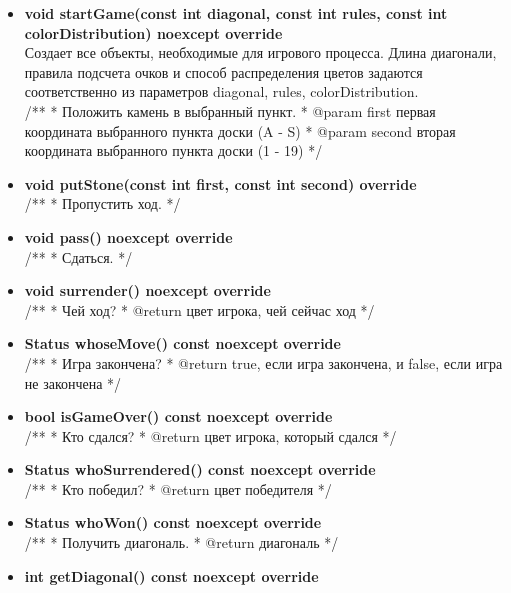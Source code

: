 \begin{itemize}

\item\textbf{void startGame(const int diagonal, const int rules, const int colorDistribution) noexcept override}\\
	
	Создает все объекты, необходимые для игрового процесса. Длина диагонали, правила подсчета очков и способ распределения цветов задаются
	соответственно из параметров diagonal, rules, colorDistribution.\\


  /**
   * Положить камень в выбранный пункт.
   * @param first первая координата выбранного пункта доски (A - S)
   * @param second вторая координата выбранного пункта доски (1 - 19)
   */
\item\textbf{void putStone(const int first, const int second) override}\\

  /**
   * Пропустить ход.
   */
\item\textbf{void pass() noexcept override}\\

  /**
   * Сдаться.
   */
\item\textbf{void surrender() noexcept override}\\

  /**
   * Чей ход?
   * @return цвет игрока, чей сейчас ход
   */
\item\textbf{Status whoseMove() const noexcept override}\\

  /**
   * Игра закончена?
   * @return true, если игра закончена, и false, если игра не закончена
   */
\item\textbf{bool isGameOver() const noexcept override}\\

  /**
   * Кто сдался?
   * @return цвет игрока, который сдался
   */
\item\textbf{Status whoSurrendered() const noexcept override}\\

  /**
   * Кто победил?
   * @return цвет победителя
   */
\item\textbf{Status whoWon() const noexcept override}\\

  /**
   * Получить диагональ.
   * @return диагональ
   */
\item\textbf{int getDiagonal() const noexcept override}\\


\end{itemize}
